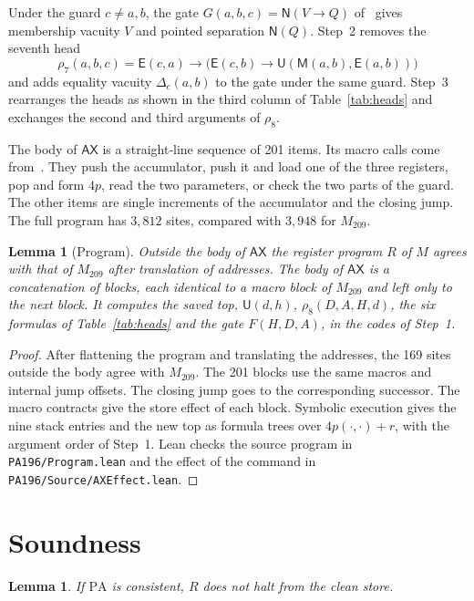 \documentclass[11pt,letterpaper]{article}
\newtheorem{lemma}[theorem]{Lemma}
\newcommand{\PA}{\mathrm{PA}}
\newcommand{\ax}{\mathsf{AX}}
\newcommand{\Mc}{\mathsf{M}}
\newcommand{\Uc}{\mathsf{U}}
\newcommand{\Ec}{\mathsf{E}}
\newcommand{\Nc}{\mathsf{N}}
\newcommand{\file}[1]{\texttt{\nolinkurl{#1}}}
\begin{document}
Under the guard $c\ne a,b$, the gate $G(a,b,c)=\Nc(V\to Q)$
of~\cite{pa209} gives membership vacuity $V$ and pointed separation
$\Nc(Q)$. Step~2 removes the seventh head
\[
 \rho_7(a,b,c)=\Ec(c,a)\to\bigl(\Ec(c,b)\to\Uc(\Mc(a,b),\Ec(a,b))\bigr)
\]
and adds equality vacuity $\Delta_c(a,b)$ to the gate under the same
guard. Step~3 rearranges the heads as shown in the third column of
Table~\ref{tab:heads} and exchanges the second and third arguments of
$\rho_8$.

The body of $\ax$ is a straight-line sequence of 201 items. Its macro
calls come from~\cite{pa209}. They push the accumulator, push it and
load one of the three registers, pop and form $4p$, read the two
parameters, or check the two parts of the guard. The other items are
single increments of the accumulator and the closing jump. The full
program has $3{,}812$ sites, compared with $3{,}948$ for $M_{209}$.

\begin{lemma}[Program]\label{lem:program}
Outside the body of $\ax$ the register program $R$ of $M$ agrees with
that of $M_{209}$ after translation of addresses. The body of $\ax$ is a concatenation of blocks, each
identical to a macro block of $M_{209}$ and left only to the next
block. It computes the saved top, $\Uc(d,h)$, $\rho_8(D,A,H,d)$, the
six formulas of Table~\ref{tab:heads} and the gate $F(H,D,A)$, in the
codes of Step~1.
\end{lemma}

\begin{proof}
After flattening the program and translating the addresses, the 169
sites outside the body agree with $M_{209}$. The 201 blocks use the
same macros and internal jump offsets. The closing jump goes to the
corresponding successor. The macro contracts give the store effect of
each block. Symbolic execution gives the nine stack entries and the
new top as formula trees over $4p(\cdot,\cdot)+r$, with the argument
order of Step~1. Lean checks the source program in
\file{PA196/Program.lean} and the effect of the command in
\file{PA196/Source/AXEffect.lean}.
\end{proof}

\section{Soundness}\label{sec:sound}

\begin{lemma}\label{lem:sound}
If $\PA$ is consistent, $R$ does not halt from the clean store.
\end{lemma}
\end{document}
